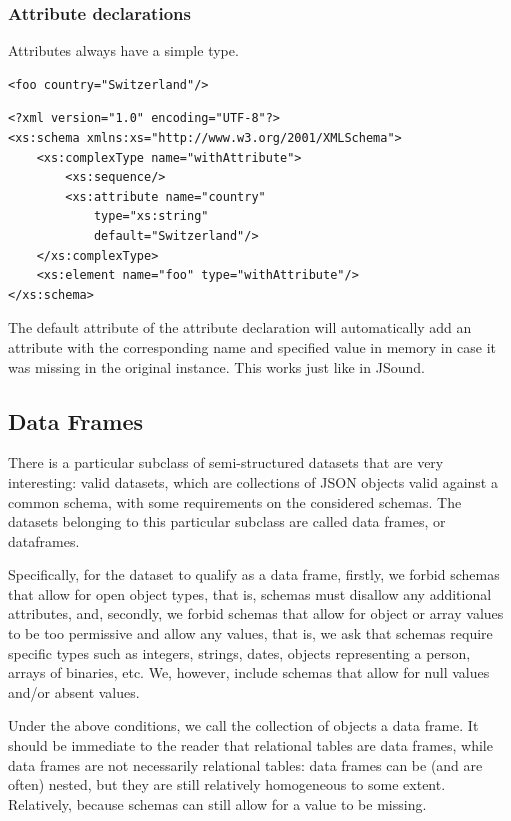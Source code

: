 \subsubsection{Attribute declarations}
Attributes always have a simple type.

\begin{lstlisting}[style=XML,caption={XML Code Example with empty content with one attribute.}]
<foo country="Switzerland"/>
\end{lstlisting}

\begin{lstlisting}[style=XML,caption={XML Schema for the above Example with empty content with one attribute.}]
<?xml version="1.0" encoding="UTF-8"?>
<xs:schema xmlns:xs="http://www.w3.org/2001/XMLSchema">
    <xs:complexType name="withAttribute">
        <xs:sequence/>
        <xs:attribute name="country"
            type="xs:string"
            default="Switzerland"/>
    </xs:complexType>
    <xs:element name="foo" type="withAttribute"/>
</xs:schema>
\end{lstlisting}

The default attribute of the attribute declaration will automatically add an attribute with the corresponding name and specified value in memory in case it was missing in the original instance. This works just like in JSound.


\subsection{Data Frames}
There is a particular subclass of semi-structured datasets that are very interesting: valid datasets, which are collections of JSON objects valid against a common schema, with some requirements on the considered schemas.
The datasets belonging to this particular subclass are called data frames, or dataframes.

Specifically, for the dataset to qualify as a data frame, firstly, we forbid schemas that allow for open object types, that is, schemas must disallow any additional attributes, and, secondly, we forbid schemas that allow for object or array values to be too permissive and allow any values, that is, we ask that schemas require specific types such as integers, strings, dates, objects representing a person, arrays of binaries, etc. We, however, include schemas that allow for null values and/or absent values.

Under the above conditions, we call the collection of objects a data frame. It should be immediate to the reader that relational tables are data frames, while data frames are not necessarily relational tables: data frames can be (and are often) nested, but they are still relatively homogeneous to some extent. Relatively, because schemas can still allow for a value to be missing.

